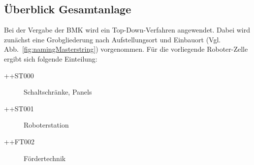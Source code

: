 \subsection*{Überblick Gesamtanlage}
\label{subsec:namingOverview}


Bei der Vergabe der BMK wird ein Top-Down-Verfahren angewendet. Dabei wird zunächst eine Grobgliederung nach Aufstellungsort und Einbauort (Vgl. Abb.~\ref{fig:namingMasterstring}) vorgenommen. Für die vorliegende Roboter-Zelle ergibt sich folgende Einteilung:

\begin{description}
  \item[++ST000] Schaltschränke, Panels
  \item[++ST001] Roboterstation
  \item[++FT002] Fördertechnik
\end{description}
